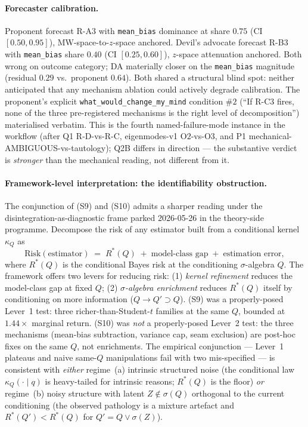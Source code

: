 \documentclass[11pt]{article}
\theoremstyle{definition}
\theoremstyle{plain}
\begin{document}
\paragraph{Forecaster calibration.}
Proponent forecast R-A3 with \texttt{mean\_bias} dominance at
share $0.75$ (CI $[0.50, 0.95]$), MW-space-to-$z$-space anchored.
Devil's advocate forecast R-B3 with \texttt{mean\_bias} share
$0.40$ (CI $[0.25, 0.60]$), $z$-space attenuation anchored. Both
wrong on outcome category; DA materially closer on the
\texttt{mean\_bias} magnitude (residual $0.29$ vs.\ proponent
$0.64$). Both shared a structural blind spot: neither anticipated
that any mechanism ablation could actively degrade calibration.
The proponent's explicit \texttt{what\_would\_change\_my\_mind}
condition $\#2$ (``If R-C3 fires, none of the three pre-registered
mechanisms is the right level of decomposition'') materialised
verbatim. This is the fourth named-failure-mode instance in the
workflow (after Q1 R-D-vs-R-C, eigenmodes-v1 O$2$-vs-O$3$, and
P1 mechanical-AMBIGUOUS-vs-tautology); Q2B differs in direction
--- the substantive verdict is \emph{stronger} than the mechanical
reading, not different from it.

\paragraph{Framework-level interpretation: the identifiability
obstruction.}
The conjunction of (S9) and (S10) admits a sharper reading under
the disintegration-as-diagnostic frame parked
2026-05-26 in the theory-side programme. Decompose the risk of any
estimator built from a conditional kernel $\kappa_{Q}$ as
\[
\mathrm{Risk}(\mathrm{estimator}) \;=\; R^{*}(Q) \;+\; \text{model-class gap} \;+\; \text{estimation error},
\]
where $R^{*}(Q)$ is the conditional Bayes risk at the
conditioning $\sigma$-algebra $Q$. The framework offers two
levers for reducing risk: (1) \emph{kernel refinement} reduces
the model-class gap at fixed $Q$; (2) \emph{$\sigma$-algebra
enrichment} reduces $R^{*}(Q)$ itself by conditioning on more
information ($Q \to Q' \supset Q$). (S9) was a properly-posed
Lever~1 test: three richer-than-Student-$t$ families at the same
$Q$, bounded at $1.44\times$ marginal return. (S10) was \emph{not}
a properly-posed Lever~2 test: the three mechanisms (mean-bias
subtraction, variance cap, seam exclusion) are post-hoc fixes on
the same $Q$, not enrichments. The empirical conjunction --- Lever~1
plateaus and naive same-$Q$ manipulations fail with two
mis-specified --- is consistent with \emph{either} regime~(a)
intrinsic structured noise (the conditional law $\kappa_{Q}(\cdot \mid q)$
is heavy-tailed for intrinsic reasons; $R^{*}(Q)$ is the floor)
\emph{or} regime~(b) noisy structure with latent $Z \notin \sigma(Q)$
orthogonal to the current conditioning (the observed pathology
is a mixture artefact and $R^{*}(Q') < R^{*}(Q)$ for $Q' = Q \vee \sigma(Z)$).
\end{document}
